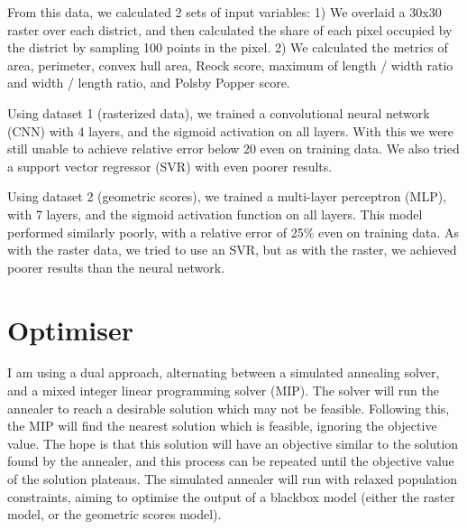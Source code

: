 \documentclass{article}
\begin{document}
From this data, we calculated 2 sets of input variables: 1) We overlaid a 30x30 raster over each district, and then calculated the share of each pixel occupied by the district by sampling 100 points in the pixel. 2) We calculated the metrics of area, perimeter, convex hull area, Reock score, maximum of length / width ratio and width / length ratio, and Polsby Popper score.

Using dataset 1 (rasterized data), we trained a convolutional neural network (CNN) with 4 layers, and the sigmoid activation on all layers. With this we were still unable to achieve relative error below 20 even on training data. We also tried a support vector regressor (SVR) with even poorer results.

Using dataset 2 (geometric scores), we trained a multi-layer perceptron (MLP), with 7 layers, and the sigmoid activation function on all layers. This model performed similarly poorly, with a relative error of 25\% even on training data. As with the raster data, we tried to use an SVR, but as with the raster, we achieved poorer results than the neural network.

\section{Optimiser}
I am using a dual approach, alternating between a simulated annealing solver, and a mixed integer linear programming solver (MIP). The solver will run the annealer to reach a desirable solution which may not be feasible. Following this, the MIP will find the nearest solution which is feasible, ignoring the objective value. The hope is that this solution will have an objective similar to the solution found by the annealer, and this process can be repeated until the objective value of the solution plateaus. The simulated annealer will run with relaxed population constraints, aiming to optimise the output of a blackbox model (either the raster model, or the geometric scores model).
\end{document}
